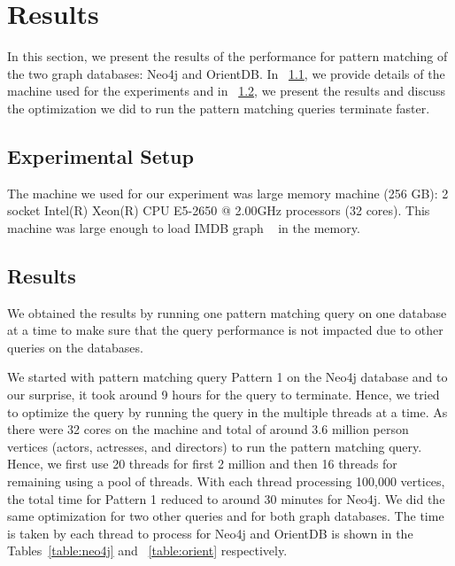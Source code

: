 
\section{Results}
In this section, we present the results of the performance for pattern matching of the two graph databases: Neo4j and OrientDB. In ~\ref{setup}, we provide details of the machine used for the experiments and in ~\ref{result}, we present the results and discuss the optimization we did to run the pattern matching queries terminate faster.

\subsection{Experimental Setup}
\label{setup}

The machine we used for our experiment was large memory machine (256 GB): 2 socket Intel(R) Xeon(R) CPU E5-2650 @ 2.00GHz processors (32 cores). This machine was large enough to load IMDB graph ~\cite{IMDb96:online} in the memory.


\subsection{Results}
\label{result}
We obtained the results by running one pattern matching query on one database at a time to make sure that the query performance is not impacted due to other queries on the databases.

We started with pattern matching query Pattern 1 on the Neo4j database and to our surprise, it took around 9 hours for the query to terminate. Hence, we tried to optimize the query by running the query in the multiple threads at a time. As there were 32 cores on the machine and total of around 3.6 million person vertices (actors, actresses, and directors) to run the pattern matching query. Hence, we first use 20 threads for first 2 million and then 16 threads for remaining using a pool of threads. With each thread processing 100,000 vertices, the total time for Pattern 1 reduced to around 30 minutes for Neo4j. We did the same optimization for two other queries and for both graph databases.
The time is taken by each thread to process for Neo4j and OrientDB is shown in the Tables~\ref{table:neo4j} and ~\ref{table:orient} respectively.

